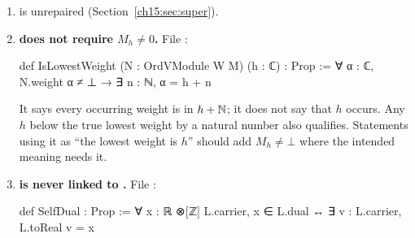 \begin{enumerate}
  $a^P_{(p)}\mathcal Y_s(u)x-\mathcal Y_s(u)a^N_{(p)}x-\sum_j\binom pj\mathcal Y_{s+p-j}(a_{(j)}u)x$, with no
  truncation or grading condition. The defect relates $\mathcal Y_s$ only to $\mathcal Y_{s+\Z}$ and is
  invariant under the shift $s\mapsto s+c$. Hence the kernel is the product, over the classes
  $\rho\in\C/\Z$, of the spaces $K_\rho$ of solutions supported on $\rho$, and the shift by $c$ maps
  $K_\rho$ isomorphically onto $K_{\rho+c}$. Either every $K_\rho$ is $0$ (and the space is $0$) or
  all of the uncountably many $K_\rho$ are nonzero (and the space is infinite-dimensional). Mathlib's
   is $0$ for infinite-dimensional spaces, so in both cases
   is $0$. So  is not the fusion rule
  $N^P_{MN}$. This is now a library theorem. File :
\begin{leancode}
theorem fusionCoeff_eq_zero (A : OrdVModule W M) (B : OrdVModule W N) (C : OrdVModule W P) :
    fusionCoeff A B C = 0 := by
\end{leancode}
  (namespace ; , ,  are arbitrary ordinary modules over an
  arbitrary VOA , and there is no other hypothesis). The proof is the one just given, with the
  explicit infinite family $c_k=ik$, $k\in\N$, of Chapter~\ref{ch:L12}, Theorem~\ref{l12:thm:fusionzero}, which
  it moves from the out-of-library certificate into the library. Status: proved; axioms standard
  ().
\item \textbf{} is unrepaired (Section~\ref{ch15:sec:super}).
\item \textbf{ does not require $M_h\ne0$.} File
  :
\begin{leancode}
def IsLowestWeight (N : OrdVModule W M) (h : ℂ) : Prop :=
  ∀ α : ℂ, N.weight α ≠ ⊥ → ∃ n : ℕ, α = h + n
\end{leancode}
  It says every occurring weight is in $h+{\mathbb{N}}$; it does not say that $h$ occurs. Any $h$ below the
  true lowest weight by a natural number also qualifies. Statements using it as ``the lowest weight
  is $h$'' should add $M_h\ne\bot$ where the intended meaning needs it.
\item \textbf{ is never linked to .} File
  :
\begin{leancode}
def SelfDual : Prop := ∀ x : ℝ ⊗[ℤ] L.carrier, x ∈ L.dual ↔ ∃ v : L.carrier, L.toReal v = x

\end{leancode}
\end{enumerate}
